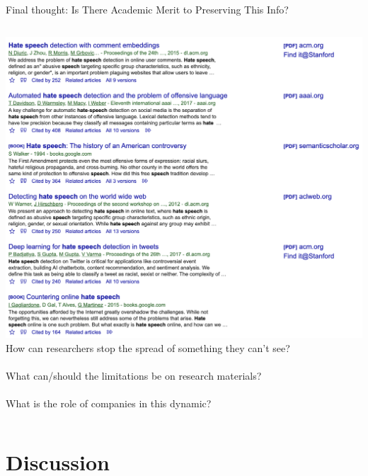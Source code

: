 \documentclass[nobackground,dvipsnames,table]{beamer}
\begin{document}
\begin{frame}{}
\begin{columns}
    \end{columns}
\end{frame}

\begin{frame}{}
    \thispagestyle{empty}
\end{frame}

\begin{frame}{Final thought: Is There Academic Merit to Preserving This Info?}
    \begin{columns}
            \includegraphics[width=\textwidth]{hate-speech-research}
            \small
            How can researchers stop the spread of something they can’t see?\\~\\
            
            What can/should the limitations be on research materials?\\~\\
            
            What is the role of companies in this dynamic?
    \end{columns}
\end{frame}

\section{Discussion}
\end{document}
